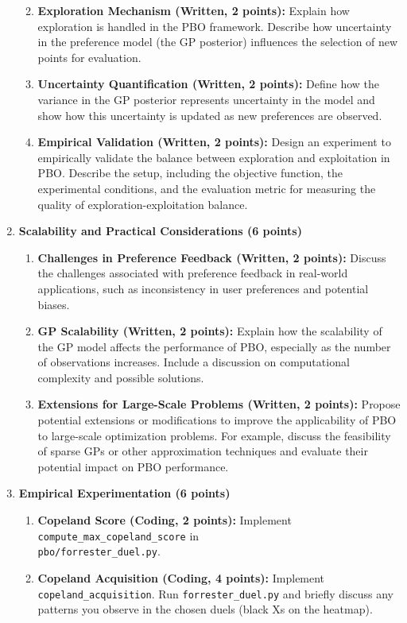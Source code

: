 \documentclass[
  letterpaper,
  numbers=noenddot,
  DIV=11]{scrreprt}
\theoremstyle{plain}
\theoremstyle{definition}
\theoremstyle{plain}
\theoremstyle{remark}
\begin{document}
\begin{enumerate}
  \begin{enumerate}
  \def\labelenumii{(\roman{enumii})}
  \item
    \textbf{Exploration Mechanism (Written, 2 points):} Explain how
    exploration is handled in the PBO framework. Describe how
    uncertainty in the preference model (the GP posterior) influences
    the selection of new points for evaluation.
  \item
    \textbf{Uncertainty Quantification (Written, 2 points):} Define how
    the variance in the GP posterior represents uncertainty in the model
    and show how this uncertainty is updated as new preferences are
    observed.
  \item
    \textbf{Empirical Validation (Written, 2 points):} Design an
    experiment to empirically validate the balance between exploration
    and exploitation in PBO. Describe the setup, including the objective
    function, the experimental conditions, and the evaluation metric for
    measuring the quality of exploration-exploitation balance.
  \end{enumerate}
\item
  \textbf{Scalability and Practical Considerations (6 points)}

  \begin{enumerate}
  \def\labelenumii{(\roman{enumii})}
  \item
    \textbf{Challenges in Preference Feedback (Written, 2 points):}
    Discuss the challenges associated with preference feedback in
    real-world applications, such as inconsistency in user preferences
    and potential biases.
  \item
    \textbf{GP Scalability (Written, 2 points):} Explain how the
    scalability of the GP model affects the performance of PBO,
    especially as the number of observations increases. Include a
    discussion on computational complexity and possible solutions.
  \item
    \textbf{Extensions for Large-Scale Problems (Written, 2 points):}
    Propose potential extensions or modifications to improve the
    applicability of PBO to large-scale optimization problems. For
    example, discuss the feasibility of sparse GPs or other
    approximation techniques and evaluate their potential impact on PBO
    performance.
  \end{enumerate}
\item
  \textbf{Empirical Experimentation (6 points)}

  \begin{enumerate}
  \def\labelenumii{(\roman{enumii})}
  \item
    \textbf{Copeland Score (Coding, 2 points):} Implement
    \texttt{compute\_max\_copeland\_score} in\\
    \texttt{pbo/forrester\_duel.py}.
  \item
    \textbf{Copeland Acquisition (Coding, 4 points):} Implement
    \texttt{copeland\_acquisition}. Run \texttt{forrester\_duel.py} and
    briefly discuss any patterns you observe in the chosen duels (black
    Xs on the heatmap).
  \end{enumerate}
\end{enumerate}
\end{document}

